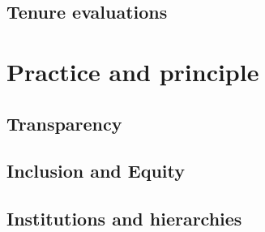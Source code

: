 \documentclass[letterpaper]{book}
\begin{document}
\chapter{Tenure evaluations}

\part{Practice and principle}

\chapter{Transparency}

\chapter{Inclusion and Equity}

\chapter{Institutions and hierarchies}
\end{document}
